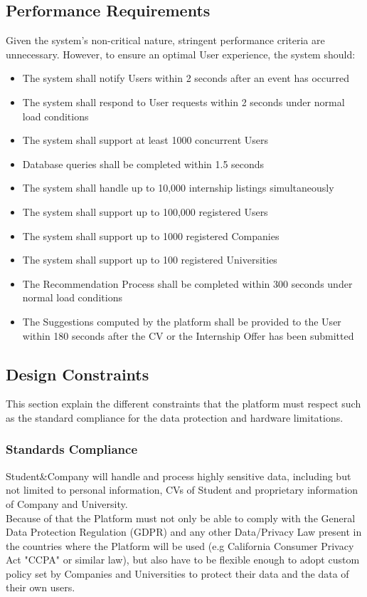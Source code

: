 \subsection{Performance Requirements}
 Given the system's non-critical nature, stringent performance criteria are unnecessary. However, to ensure an optimal User experience, the system should:
\begin{itemize}
  \item The system shall notify Users within 2 seconds after an event has occurred
  \item The system shall respond to User requests within 2 seconds under normal load conditions
  \item The system shall support at least 1000 concurrent Users
  \item Database queries shall be completed within 1.5 seconds
  \item The system shall handle up to 10,000 internship listings simultaneously
  \item The system shall support up to 100,000 registered Users
  \item The system shall support up to 1000 registered Companies
  \item The system shall support up to 100 registered Universities
  \item The Recommendation Process shall be completed within 300 seconds under normal load conditions
  \item The Suggestions computed by the platform shall be provided to the User within 180 seconds after the CV or the Internship Offer has been submitted
\end{itemize}
\subsection{Design Constraints}
This section explain the different constraints that the platform must respect such as the standard compliance for the data protection and hardware limitations.
\subsubsection{Standards Compliance}
Student\&Company will handle and process highly sensitive data, including but not limited to personal information, CVs of Student and proprietary information of Company and University.\\
Because of that the Platform must not only be able to comply with the General Data Protection Regulation (GDPR) and any other Data/Privacy Law present in the countries where the Platform will be used (e.g California Consumer Privacy Act "CCPA" or similar law), but also have to be flexible enough to adopt custom policy set by Companies and Universities to protect their data and the data of their own users.
